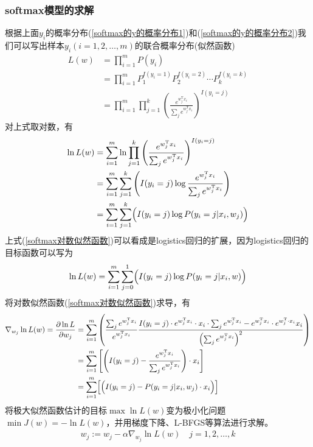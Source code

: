         \subsubsection{softmax模型的求解}
            \par
            根据上面$y_i$的概率分布(\ref{softmax的y的概率分布1})和(\ref{softmax的y的概率分布2})我们可以写出样本$y_i(i=1,2,\dots,m)$的联合概率分布(似然函数)
            \begin{align*}
            L(w) & = \prod _{i=1}^m P(y_i)\\
            & =\prod_{i=1}^m P_1^{I(y_i=1)}P_2^{I(y_i=2)}\cdots P_k^{I(y_i=k)}\\
            & = \prod_{i=1}^m\prod_{j=1}^k \left( \frac{e^{w_j^\mathrm{T}x_i}}{\sum_je^{w_j^\mathrm{T}x_i}} \right) ^{I(y_i=j)}
            \end{align*}
            对上式取对数，有
            \begin{align}
            \label{softmax对数似然函数}
            \ln L(w) &= \sum_{i=1}^m\ln \prod_{j=1}^k \left( \frac{e^{w_j^\mathrm{T}x_i}}{\sum_je^{w_j^\mathrm{T}x_i}} \right) ^{I(y_i=j)} \notag \\
            &=\sum_{i=1}^m\sum_{j=1}^k \left( I(y_i=j) \log \frac{e^{w_j^\mathrm{T}x_i}}{\sum_je^{w_j^\mathrm{T}x_i}} \right) \notag \\
            &=\sum_{i=1}^m\sum_{j=1}^k \Bigl(I(y_i=j) \log P(y_i = j|x_i,w_j) \Bigr)
            \end{align}
            上式(\ref{softmax对数似然函数})可以看成是logistics回归的扩展，因为logistics回归的目标函数可以写为
            \begin{align*}
            \ln L(w) = \sum_{i=1}^m\sum_{j=0}^1 \Bigl(I(y_i=j) \log P(y_i = j|x_i,w) \Bigr)
            \end{align*}
            将对数似然函数(\ref{softmax对数似然函数})求导，有
            \begin{align*}
            \nabla_{w_j} \ln L(w) = \frac{\partial \ln L}{\partial w_j} &= \sum_{i=1}^m \left( \frac{\sum_j e^{w_j^\mathrm{T}x_i} }{e^{w_j^\mathrm{T}x_i}}  \frac{I(y_i = j) \cdot e^{w_j^\mathrm{T}x_i} \cdot x_i \cdot \sum_je^{w_j^\mathrm{T}x_i} - e^{w_j^\mathrm{T}x_i} \cdot e^{w_j^\mathrm{T} \cdot x_i} x_i}{ \left( \sum_je^{w_j^\mathrm{T}x_i} \right)^2  }\right)\\
            &= \sum_{i=1}^m\left[ \left( I(y_i=j)-\frac{e^{w_j^\mathrm{T}x_i}}{\sum_j e^{w_j^\mathrm{T}x_i}} \right) \cdot x_i    \right]\\
            &=\sum_{i=1}^m \Bigl[\Bigl(I(y_i=j) - P(y_i=j|x_i,w_j) \cdot x_i\Bigr)\Bigr]
            \end{align*}
            将极大似然函数估计的目标$\max\ln L(w)$变为极小化问题$\min J(w) = -\ln L(w)$，并用梯度下降、L-BFGS等算法进行求解。
            \begin{align*}
            w_j:=w_j - \alpha \nabla_{w_j} \ln L(w) \quad j=1,2,\dots,k
            \end{align*}
